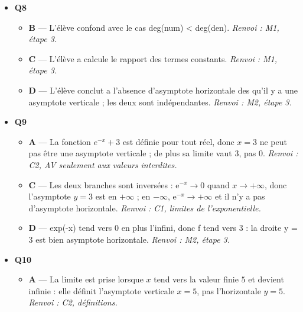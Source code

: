 \begin{itemize}
  \begin{itemize}
    \item \textbf{A} — L'élève a pris le zero du numérateur au lieu du dénominateur. \emph{Renvoi : M2, étape 2.}
    \item \textbf{B} — x = 0 n'annule pas le dénominateur : la fonction y est définie ($f(0)=-1/3$), donc il n'y a pas d'asymptote verticale en 0. \emph{Renvoi : M2, étape 1.}
    \item \textbf{C} — La droite $y=1$ est horizontale et provient de la limite du quotient a l'infini ; elle ne peut pas être l'asymptote verticale demandee. \emph{Renvoi : C2, définition AH vs AV.}
  \end{itemize}
  \item \textbf{Q8}
  \begin{itemize}
    \item \textbf{B} — L'élève confond avec le cas deg(num) < deg(den). \emph{Renvoi : M1, étape 3.}
    \item \textbf{C} — L'élève a calcule le rapport des termes constants. \emph{Renvoi : M1, étape 3.}
    \item \textbf{D} — L'élève conclut a l'absence d'asymptote horizontale des qu'il y a une asymptote verticale ; les deux sont indépendantes. \emph{Renvoi : M2, étape 3.}
  \end{itemize}
  \item \textbf{Q9}
  \begin{itemize}
    \item \textbf{A} — La fonction $e^{-x}+3$ est définie pour tout réel, donc $x=3$ ne peut pas être une asymptote verticale ; de plus sa limite vaut $3$, pas $0$. \emph{Renvoi : C2, AV seulement aux valeurs interdites.}
    \item \textbf{C} — Les deux branches sont inversées : $\mathrm{e}^{-x}\to0$ quand $x\to+\infty$, donc l'asymptote $y=3$ est en $+\infty$ ; en $-\infty$, $\mathrm{e}^{-x}\to+\infty$ et il n'y a pas d'asymptote horizontale. \emph{Renvoi : C1, limites de l'exponentielle.}
    \item \textbf{D} — exp(-x) tend vers 0 en plus l'infini, donc f tend vers 3 : la droite y = 3 est bien asymptote horizontale. \emph{Renvoi : M2, étape 3.}
  \end{itemize}
  \item \textbf{Q10}
  \begin{itemize}
    \item \textbf{A} — La limite est prise lorsque $x$ tend vers la valeur finie $5$ et devient infinie : elle définit l'asymptote verticale $x=5$, pas l'horizontale $y=5$. \emph{Renvoi : C2, définitions.}

\end{itemize}
\end{itemize}
